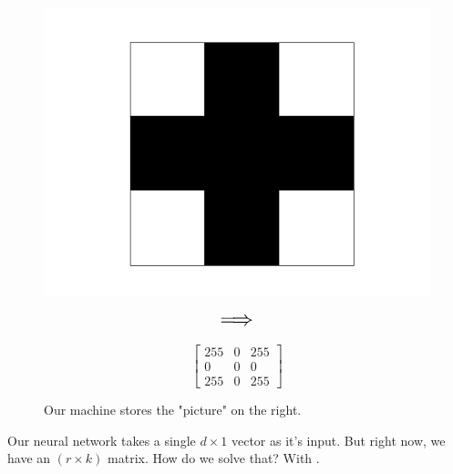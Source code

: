         \begin{figure}[ht]
            \begin{minipage}{.35\textwidth}
              \centering
              \includegraphics[width=.9\linewidth]{images/convolutional_neural_networks_images/crossgrid.png} 
            \end{minipage}
            \begin{minipage}{.3\textwidth}
                \centering
                $$\mathlarger{\mathlarger{\mathlarger{\implies}}}$$
            \end{minipage}
            \begin{minipage}{.1\textwidth}
                \centering
              \[
              \begin{bmatrix}
                  255 & 0 & 255 \\
                  0 & 0 & 0 \\
                  255 & 0 & 255
              \end{bmatrix}
              \]
            \end{minipage}
            \caption*{Our machine stores the "picture" on the right.}
        \end{figure}

        Our neural network takes a single $d \times 1$ vector as it's input. But right now, we have an $(r \times k)$ matrix. How do we solve that? With .\\

